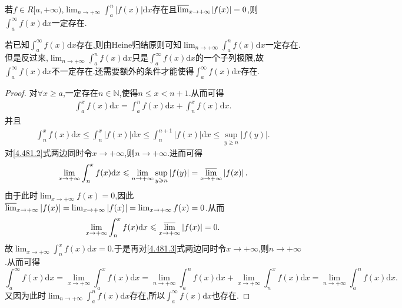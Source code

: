\documentclass[../../main.tex]{subfiles}
\begin{document}
\begin{proposition}\label{proposition:反常积分与其子列极限存在命题}
若\(f\in R[a, +\infty)\),\(\lim_{n\rightarrow +\infty}\int_a^n|f(x)|\mathrm{d}x\)存在且\({\varlimsup_{x\rightarrow +\infty}}|f(x)| = 0\),则\(\int_a^{\infty}f(x)\mathrm{d}x\)一定存在.
\end{proposition}
\begin{note}
若已知$\int_a^{\infty}f(x)\mathrm{d}x$存在,则由Heine归结原则可知\(\lim_{n\rightarrow +\infty}\int_a^n f(x)\mathrm{d}x\)一定存在.但是反过来,\(\lim_{n\rightarrow +\infty}\int_a^n f(x)\mathrm{d}x\)只是$\int_a^{\infty}f(x)\mathrm{d}x$的一个子列极限,故$\int_a^{\infty}f(x)\mathrm{d}x$不一定存在.还需要额外的条件才能使得$\int_a^{\infty}f(x)\mathrm{d}x$存在.
\end{note}
\begin{proof}
对\(\forall x\geqslant a\),一定存在\(n\in\mathbb{N}\),使得\(n\leqslant x < n + 1\).从而可得
\begin{align}\label{4.481.3}
\int_a^x f(x)\mathrm{d}x=\int_a^n f(x)\mathrm{d}x+\int_n^x f(x)\mathrm{d}x. 
\end{align}
并且
\begin{align}\label{4.481.2}
\int_n^x f(x)\mathrm{d}x\leqslant\int_n^x\left|f(x)\right|\mathrm{d}x\leqslant\int_n^{n + 1}\left|f(x)\right|\mathrm{d}x\leqslant\sup_{y\geqslant n}\left|f(y)\right|.
\end{align}
对\eqref{4.481.2}式两边同时令\(x\rightarrow +\infty\),则\(n\rightarrow +\infty\).进而可得
\[
\lim_{x\rightarrow +\infty}\int_n^x f(x)\mathrm{d}x\leqslant\lim_{n\rightarrow +\infty}\sup_{y\geqslant n}\left|f(y)\right|={\varlimsup_{x\rightarrow +\infty}}\left|f(x)\right|.
\]
由于此时\(\lim_{x\rightarrow +\infty}f(x)=0\),因此\({\varlimsup_{x\rightarrow +\infty}}\left|f(x)\right|=\lim_{x\rightarrow +\infty}\left|f(x)\right|=\lim_{x\rightarrow +\infty}f(x)=0\).从而
\[
\lim_{x\rightarrow +\infty}\int_n^x f(x)\mathrm{d}x\leqslant{\varlimsup_{x\rightarrow +\infty}}\left|f(x)\right|=0.
\]
故\(\lim_{x\rightarrow +\infty}\int_n^x f(x)\mathrm{d}x = 0\).于是再对\eqref{4.481.3}式两边同时令\(x\rightarrow +\infty\),则\(n\rightarrow +\infty\).从而可得
\[
\int_a^{\infty}f(x)\mathrm{d}x=\lim_{x\rightarrow +\infty}\int_a^x f(x)\mathrm{d}x=\lim_{n\rightarrow +\infty}\int_a^n f(x)\mathrm{d}x+\lim_{x\rightarrow +\infty}\int_n^x f(x)\mathrm{d}x=\lim_{n\rightarrow +\infty}\int_a^n f(x)\mathrm{d}x.
\]
又因为此时\(\lim_{n\rightarrow +\infty}\int_a^n f(x)\mathrm{d}x\)存在,所以\(\int_a^{\infty}f(x)\mathrm{d}x\)也存在.

\end{proof}
\end{document}

